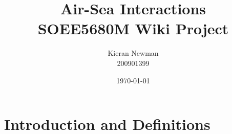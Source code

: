 \documentclass{report}
\begin{document}
  
  \title{Air-Sea Interactions\\SOEE5680M Wiki Project} 
  \author{Kieran Newman\\200901399}
  \date{\small\today}
  \maketitle
  
  \ifdefined\HCode
  \fi
  
  \tableofcontents
  
  \ifdefined\HCode
  \fi
  
  \chapter{Introduction and Definitions} 

  \ifdefined\HCode
  \else
  {
  \startcontents[chapter]
  }
  \fi
    
  
   
  \ifdefined\HCode
  \fi
  
  \ifdefined\HCode
  \else
  {
  \stopcontents[chapter]
  } 
  \fi
\end{document}
